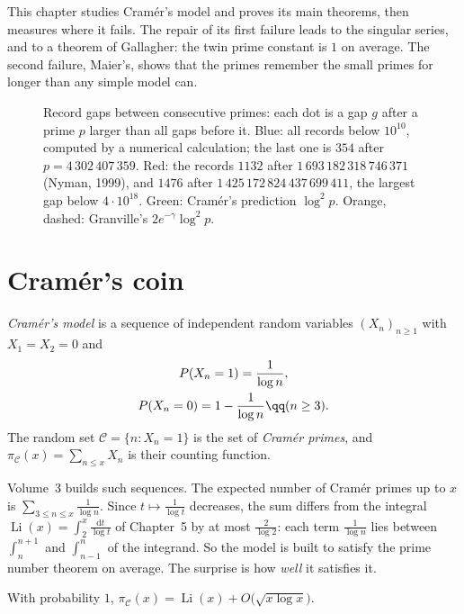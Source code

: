 This chapter studies Cramér's model and proves its main theorems, then measures where it fails. The repair of its first failure leads to the singular series, and to a theorem of
Gallagher: the twin prime constant is $1$ on average. The second failure, Maier's, shows that the primes remember the small primes for longer than any simple model can.

\begin{figure}[ht]
\centering
{}
\caption{Record gaps between consecutive primes: each dot is a gap $g$ after a prime $p$ larger than all gaps before it. Blue: all records below $10^{10}$, computed by a numerical calculation; the last one is
$354$ after $p=4\,302\,407\,359$. Red: the records $1132$ after $1\,693\,182\,318\,746\,371$ (Nyman, 1999), and $1476$ after $1\,425\,172\,824\,437\,699\,411$, the largest gap below $4\cdot10^{18}$. Green: Cramér's
prediction $\log^2p$. Orange, dashed: Granville's $2e^{-\gamma}\log^2p$.}
\label{fig:gaps}
\end{figure}

\section{Cramér's coin}

\begin{definition}\label{def:cramer}
\emph{Cramér's model} is a sequence of independent random variables $(X_n)_{n\ge1}$ with $X_1=X_2=0$ and
\[
\begin{gathered}P(X_n=1)=\frac1{\log n},\\P(X_n=0)=1-\frac1{\log n}\qq(n\ge3).\end{gathered}
\]
The random set $\mathcal C=\{n:X_n=1\}$ is the set of \emph{Cramér primes}, and $\pi_{\mathcal C}(x)=\sum_{n\le x}X_n$ is their counting function.
\end{definition}

Volume~3 builds such sequences. The expected number of Cramér primes up to $x$ is $\sum_{3\le n\le x}\frac1{\log n}$. Since $t\mapsto\frac1{\log t}$ decreases, the sum differs from the
integral $\operatorname{Li}(x)=\int_2^x\frac{\mathrm dt}{\log t}$ of Chapter~5 by at most $\frac2{\log2}$: each term $\frac1{\log n}$ lies between $\int_n^{n+1}$ and $\int_{n-1}^n$ of the integrand.
So the model is built to satisfy the prime number theorem on average. The surprise is how \emph{well} it satisfies it.

\begin{theorem}[Cramér]\label{thm:cramerpnt}
With probability $1$, $\pi_{\mathcal C}(x)=\operatorname{Li}(x)+O\bigl(\sqrt{x\log x}\bigr)$.
\end{theorem}

